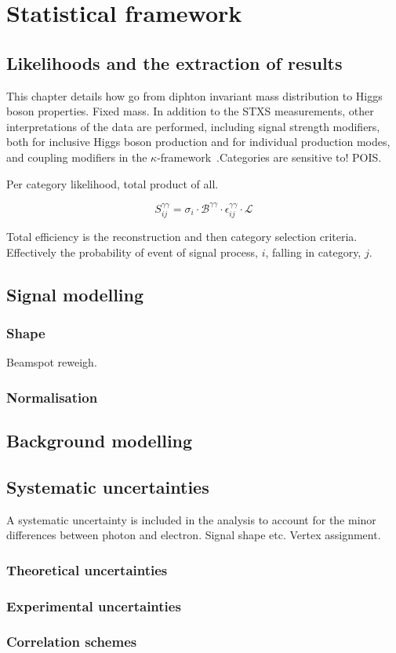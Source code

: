 \chapter{Statistical framework}
\label{chap:hgg_stats}

\section{Likelihoods and the extraction of results}
This chapter details how go from diphton invariant mass distribution to Higgs boson properties. Fixed mass.
In addition to the STXS measurements, other interpretations of the data are performed, including signal strength modifiers, both for inclusive Higgs boson production and for individual production modes, and coupling modifiers in the $\kappa$-framework~\cite{}.Categories are sensitive to! POIS.

Per category likelihood, total product of all.

\begin{equation}
    S^{\gamma\gamma}_{ij} = \sigma_i \cdot \mathcal{B}^{\gamma\gamma} \cdot \epsilon^{\gamma\gamma}_{ij} \cdot \mathcal{L}
\end{equation}

Total efficiency is the reconstruction and then category selection criteria. Effectively the probability of event of signal process, $i$, falling in category, $j$.

\section{Signal modelling}
\subsection{Shape}
Beamspot reweigh. 

\subsection{Normalisation}


\section{Background modelling}\label{sec:bkg_modeling}

\section{Systematic uncertainties}
A systematic uncertainty is included in the analysis to account for the minor differences between photon and electron. Signal shape etc. Vertex assignment.
\subsection{Theoretical uncertainties}

\subsection{Experimental uncertainties}

\subsection{Correlation schemes}